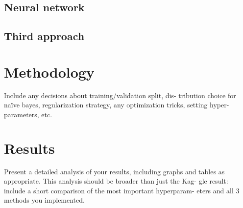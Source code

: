 \documentclass[conference]{IEEEtran}
\begin{document}
\subsection{Neural network}

\subsection{Third approach}


\section{Methodology}

Include any decisions about training/validation split, dis- tribution choice for naïve bayes, regularization strategy, any optimization tricks, setting hyper-parameters, etc.

\section{Results}

Present a detailed analysis of your results, including graphs and tables as appropriate. This analysis should be broader than just the Kag- gle result: include a short comparison of the most important hyperparam- eters and all 3 methods you implemented.



\end{document}

